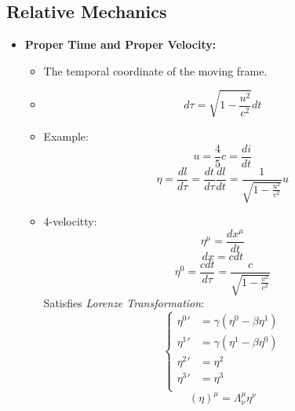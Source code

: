 \documentclass[fleqn,a4paper,12pt]{article}
\begin{document}
\subsection{Relative Mechanics}
\begin{itemize}
  \item \textbf{Proper Time and Proper Velocity:}\\
    \begin{itemize}
    \item
      The temporal coordinate of the moving frame.
    \item
      \[ d \tau = \sqrt{ 1 - \frac{u^2}{c^2} } dt \]
    \item Example:\\
      \[ u = \frac{4}{5}c = \frac{di}{dt} \]
      \[ \eta = \frac{ dl }{ d \tau } = \frac{ dt }{ d \tau } \frac{ d l }{ d t } = \frac{1}{ \sqrt{ 1 - \frac{ u^2 }{ c^2 } } } u\]

      \item 4-velocitty:
        \[ \eta ^ \mu = \frac{ d x^\mu }{ dt } \]
        \[ dx = c dt \]
        \[ \eta ^0 = \frac{ c dt }{ d \tau } =  \frac{ c }{ \sqrt{ 1 - \frac{ v^2 }{ c^2 } } }   \]
        Satisfies \textit{Lorenze Transformation}:\\
        \[ 
          \begin{cases}
            {\eta^0}' &= \gamma ( \eta^0 - \beta \eta^1 ) \\
            {\eta^1}' &= \gamma (\eta^1 - \beta \eta^0 )  \\
            {\eta^2}' &= \eta^2 \\
            {\eta^3}' &= \eta^3 \\
          \end{cases}
        \]
        \[(\eta)^\mu = \Lambda^\mu_\nu \eta^\nu \]


\end{itemize}
\end{itemize}
\end{document}
